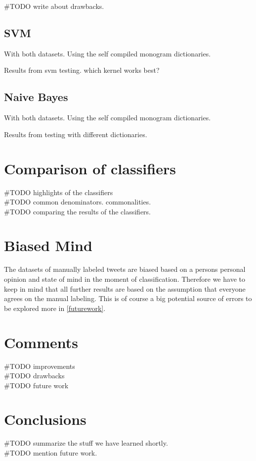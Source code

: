 #TODO write about drawbacks. 

\subsection{SVM}\label{sentiment:svm_classification}
With both datasets.
Using the self compiled monogram dictionaries. 

Results from svm testing. which kernel works best?

\subsection{Naive Bayes}\label{sentiment:naive_bayes_classification}
With both datasets.
Using the self compiled monogram dictionaries. 

Results from testing with different dictionaries. 

\section{Comparison of classifiers}
#TODO highlights of the classifiers \\
#TODO common denominators. commonalities.\\
#TODO comparing the results of the classifiers. \\

\section{Biased Mind}
The datasets of manually labeled tweets are biased based on a persons 
personal opinion and state of mind in the moment of classification.
Therefore we have to keep in mind that all further results are based on the
assumption that everyone agrees on the manual labeling. This is of course a big
potential source of errors to be explored more in \ref{futurework}. 

\section{Comments}
#TODO improvements \\
#TODO drawbacks \\
#TODO future work \\

\section{Conclusions}
#TODO summarize the stuff we have learned shortly. \\
#TODO mention future work. \\
